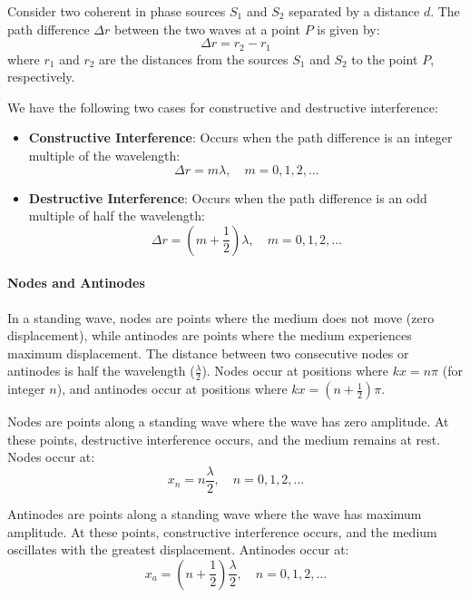 \documentclass[11pt]{report}
\begin{document}
\begin{definition}[Interference]
    Consider two coherent in phase sources $S_1$ and $S_2$ separated by a distance \( d \). The path difference \( \Delta r \) between the two waves at a point \( P \) is given by:
    $$
        \Delta r = r_2 - r_1
    $$
    where \( r_1 \) and \( r_2 \) are the distances from the sources \( S_1 \) and \( S_2 \) to the point \( P \), respectively.

    We have the following two cases for constructive and destructive interference:
    \begin{itemize}
        \item \textbf{Constructive Interference}: Occurs when the path difference is an integer multiple of the wavelength:
        $$
            \Delta r = m \lambda, \quad m = 0, 1, 2, \ldots
        $$
        \item \textbf{Destructive Interference}: Occurs when the path difference is an odd multiple of half the wavelength:
        $$
            \Delta r = \left(m + \frac{1}{2}\right) \lambda, \quad m = 0, 1, 2, \ldots
        $$
    \end{itemize}
\end{definition}

\paragraph{Nodes and Antinodes} In a standing wave, nodes are points where the medium does not move (zero displacement), while antinodes are points where the medium experiences maximum displacement. The distance between two consecutive nodes or antinodes is half the wavelength (\( \frac{\lambda}{2} \)). Nodes occur at positions where \( kx = n\pi \) (for integer \( n \)), and antinodes occur at positions where \( kx = (n + \frac{1}{2})\pi \).
\begin{definition}[Nodes]
    Nodes are points along a standing wave where the wave has zero amplitude. At these points, destructive interference occurs, and the medium remains at rest. Nodes occur at:
    $$
        x_n = n \frac{\lambda}{2}, \quad n = 0, 1, 2, \ldots
    $$
\end{definition}
\begin{definition}[Antinodes]
    Antinodes are points along a standing wave where the wave has maximum amplitude. At these points, constructive interference occurs, and the medium oscillates with the greatest displacement. Antinodes occur at:
    $$
        x_a = \left(n + \frac{1}{2}\right) \frac{\lambda}{2}, \quad n = 0, 1, 2, \ldots
    $$
\end{definition}
\end{document}
